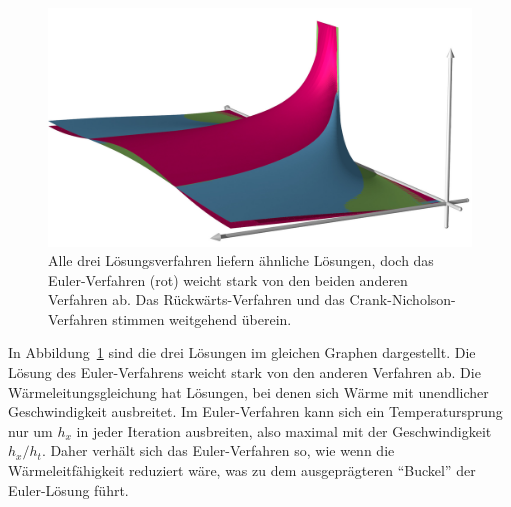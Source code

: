 \begin{figure}
\centering
\includegraphics[width=\hsize]{chapters/70-pde/images/combined.jpg}
\caption{Alle drei Lösungsverfahren liefern ähnliche Lösungen,
doch das Euler-Verfahren (rot) weicht stark von den beiden anderen
Verfahren ab.
Das Rückwärts-Verfahren und das Crank-Nicholson-Verfahren stimmen
weitgehend überein.
\label{buch:pde:waerme:figure:combined}}
\end{figure}
In Abbildung~\ref{buch:pde:waerme:figure:combined} sind die drei
Lösungen im gleichen Graphen dargestellt. 
Die Lösung des Euler-Verfahrens weicht stark von den anderen Verfahren ab.
Die Wärmeleitungsgleichung hat Lösungen, bei denen sich Wärme mit
unendlicher Geschwindigkeit ausbreitet.
%
%
Im Euler-Verfahren kann sich ein Temperatursprung nur um $h_x$ in
jeder Iteration ausbreiten, also maximal mit der Geschwindigkeit $h_x/h_t$.
Daher verhält sich das Euler-Verfahren so, wie wenn die Wärmeleitfähigkeit
reduziert wäre, was zu dem ausgeprägteren ``Buckel'' der Euler-Lösung
führt.
%


